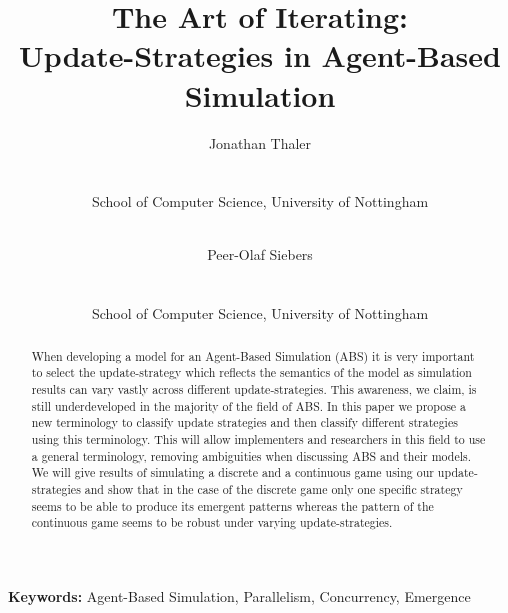 \documentclass[a4paper, 10pt, conference]{IEEEconf}
\title{The Art of Iterating:\\Update-Strategies in Agent-Based Simulation}
\author{
	Jonathan Thaler \\
	\email{jonathan.thaler@nottingham.ac.uk} \\
	\begin{affiliation}
		School of Computer Science, University of Nottingham
	\end{affiliation} \\
	\and 
	Peer-Olaf Siebers \\
	\email{peer-olaf.siebers@nottingham.ac.uk} \\
	\begin{affiliation}
		School of Computer Science, University of Nottingham
	\end{affiliation} 
}
\begin{document}
\maketitle

\begin{abstract}
When developing a model for an Agent-Based Simulation (ABS) it is very important to select the update-strategy which reflects the semantics of the model as simulation results can vary vastly across different update-strategies. This awareness, we claim, is still underdeveloped in the majority of the field of ABS. In this paper we propose a new terminology to classify update strategies and then classify different strategies using this terminology. This will allow implementers and researchers in this field to use a general terminology, removing ambiguities when discussing ABS and their models. We will give results of simulating a discrete and a continuous game using our update-strategies and show that in the case of the discrete game only one specific strategy seems to be able to produce its emergent patterns whereas the pattern of the continuous game seems to be robust under varying update-strategies.
\end{abstract}

\textbf{Keywords:} Agent-Based Simulation, Parallelism, Concurrency, Emergence














%
%
\end{document}
